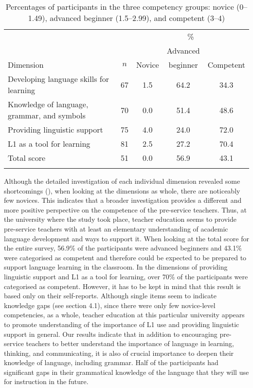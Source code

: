 \documentclass[output=paper]{langscibook}
\begin{document}
\begin{table}
\begin{tabularx}{\textwidth}{X cccc}
\lsptoprule
          &     & \multicolumn{3}{c}{\%}\\\cmidrule(lr){3-5}
          &     &          & Advanced   & \\
Dimension & $n$ & {Novice} & {beginner} & {Competent}\\\midrule
Developing language skills for learning     & 67 & 1.5 & 64.2 & 34.3\\
Knowledge of language, grammar, and symbols & 70 & 0.0 & 51.4 & 48.6\\
Providing linguistic support                & 75 & 4.0 & 24.0 & 72.0\\
L1 as a tool for learning                   & 81 & 2.5 & 27.2 & 70.4\\
Total score                                 & 51 & 0.0 & 56.9 & 43.1\\
\lspbottomrule
\end{tabularx}
\caption{Percentages of participants in the three competency groups: novice (0–1.49), advanced beginner (1.5–2.99), and competent (3–4)}
\label{tab:Alisaari:2}
\end{table}

\hspace*{-3.9pt}Although the detailed investigation of each individual dimension revealed some shortcomings (), when looking at the dimensions as whole, there are noticeably few novices. This indicates that a broader investigation provides a different and more positive perspective on the competence of the pre-service teachers.  Thus, at the university where the study took place, teacher education seems to provide pre-service teachers with at least an elementary understanding of academic language development and ways to support it. When looking at the total score for the entire survey, 56.9\% of the participants were advanced beginners and 43.1\% were categorised as competent and therefore could be expected to be prepared to support language learning in the classroom. In the dimensions of providing linguistic support and L1 as a tool for learning, over 70\% of the participants were categorised as competent. However, it has to be kept in mind that this result is based only on their self-reports. Although single items seem to indicate knowledge gaps (see section 4.1), since there were only few novice-level competencies, as a whole, teacher education at this particular university appears to promote understanding of the importance of L1 use and providing linguistic support in general. Our results indicate that in addition to encouraging pre-service teachers to better understand the importance of language in learning, thinking, and communicating, it is also of crucial importance to deepen their knowledge of language, including grammar. Half of the participants had significant gaps in their grammatical knowledge of the language that they will use for instruction in the future.
\end{document}
